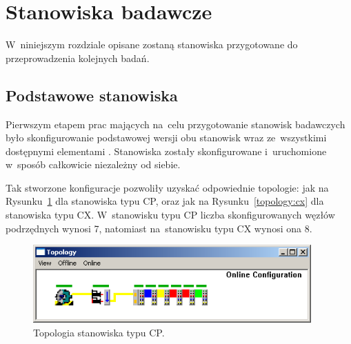 \section{Stanowiska badawcze}
\label{sec:stanowiska}
W~niniejszym rozdziale opisane zostaną stanowiska przygotowane do przeprowadzenia kolejnych badań.

\subsection{Podstawowe stanowiska}
Pierwszym etapem prac mających na~celu przygotowanie stanowisk badawczych było skonfigurowanie podstawowej wersji obu stanowisk wraz ze~wszystkimi dostępnymi elementami \cite{kurs2}. Stanowiska zostały skonfigurowane i~uruchomione w~sposób całkowicie niezależny od siebie.

Tak stworzone konfiguracje pozwoliły uzyskać odpowiednie topologie: jak na Rysunku~\ref{topology:cp} dla stanowiska typu CP, oraz jak na Rysunku~\ref{topology:cx} dla stanowiska typu CX. W~stanowisku typu CP liczba skonfigurowanych węzłów podrzędnych wynosi 7, natomiast na~stanowisku typu CX wynosi ona 8.
\begin{figure}[!htb] 	\centering 	\includegraphics[width=0.95\textwidth]{images/topologyCP} \caption{Topologia stanowiska typu CP.} \label{topology:cp} \end{figure}


